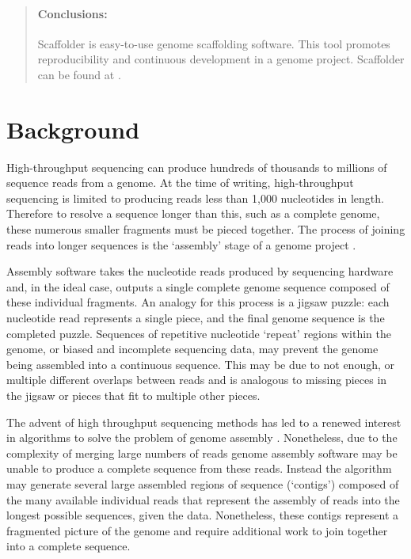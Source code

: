 \documentclass[10pt]{bmc_article}
\newenvironment{bmcformat}{\begin{raggedright}\baselineskip20pt\sloppy\setboolean{publ}{false}}{\end{raggedright}\baselineskip20pt\sloppy}
\begin{document}
\begin{bmcformat}
\begin{abstract}
  \paragraph*{Conclusions:} Scaffolder is easy-to-use genome scaffolding
  software. This tool promotes reproducibility and continuous development in a
  genome project. Scaffolder can be found at \scaffolder.

\end{abstract}


\clearpage

\section*{Background} %

High-throughput sequencing can produce hundreds of thousands to millions of
sequence reads from a genome. At the time of writing, high-throughput
sequencing is limited to producing reads less than 1,000 nucleotides in length.
Therefore to resolve a sequence longer than this, such as a complete genome,
these numerous smaller fragments must be pieced together. The process of
joining reads into longer sequences is the `assembly' stage of a genome project
\cite{miller2010}. \pb

Assembly software takes the nucleotide reads produced by sequencing hardware
and, in the ideal case, outputs a single complete genome sequence composed of
these individual fragments. An analogy for this process is a jigsaw puzzle:
each nucleotide read represents a single piece, and the final genome sequence
is the completed puzzle. Sequences of repetitive nucleotide `repeat' regions
within the genome, or biased and incomplete sequencing data, may prevent the
genome being assembled into a continuous sequence. This may be due to not
enough, or multiple different overlaps between reads and is analogous to
missing pieces in the jigsaw or pieces that fit to multiple other pieces. \pb

The advent of high throughput sequencing methods has led to a renewed interest
in algorithms to solve the problem of genome assembly \cite{pop2008,pop2009}.
Nonetheless, due to the complexity of merging large numbers of reads genome
assembly software may be unable to produce a complete sequence from these
reads. Instead the algorithm may generate several large assembled regions of
sequence (`contigs') composed of the many available individual reads that
represent the assembly of reads into the longest possible sequences, given the
data. Nonetheless, these contigs represent a fragmented picture of the genome
and require additional work to join together into a complete sequence. \pb


\end{bmcformat}
\end{document}
